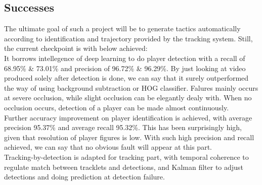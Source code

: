 \documentclass{article}
\begin{document}
\subsection{Successes}
The ultimate goal of such a project will be to generate tactics automatically according to identification and trajectory provided by the tracking system. Still, the current checkpoint is with below achieved:\\
It borrows intellegence of deep learning to do player detection with a recall of 68.95\% \& 73.01\% and precision of 96.72\% \& 96.29\%. By just looking at video produced solely after detection is done, we can say that it surely outperformed the way of using background subtraction or HOG classifier. Falures mainly occurs at severe occlusion, while slight occlusion can be elegantly dealy with. When no occlusion occurs, detection of a player can be made almost continuously.\\
Further accuracy improvement on player identification is achieved, with average precision 95.37\% and average recall 95.32\%. This has been surprisingly high, given that resolution of player figures is low. With such high precision and recall achieved, we can say that no obvious fault will appear at this part.\\
Tracking-by-detection is adapted for tracking part, with temporal coherence to regulate match between tracklets and detections, and Kalman filter to adjust detections and doing prediction at detection failure.
\end{document}
